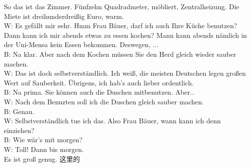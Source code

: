 So das ist das Zimmer. Fünfzehn Quadradmeter, möbliert, Zentralheizung.
Die Miete ist dreihunderdreißig Euro, warm. \\
W: Es gefällt mir sehr. Hmm Frau Bäuer, darf ich auch Ihre Küche benutzen?
Dann kann ich mir abends etwas zu essen kochen?
Mann kann abends nämlich in der Uni-Mensa kein Essen bekommen. Deswegen, ...  \\
B: Na klar. Aber nach dem Kochen müssen Sie den Herd gleich wieder sauber machen. \\
W: Das ist doch selbstverständlich.
Ich weiß, die meisten Deutschen legen großen Wert auf Sauberkeit. 
Übrigens, ich hab's auch lieber ordentlich.  \\
B: Na prima. Sie können auch die Duschen mitbenutzen. Aber.. \\
W: Nach dem Benuzten soll ich die Duschen gleich sauber machen. \\
B: Genau. \\
W: Selbstverständlich tue ich das. Also Frau Bäuer, wann kann ich denn einziehen? \\
B: Wie wär's mit morgen?  \\
W: Toll! Dann bis morgen. \\
Es ist groß genug. 这里的
